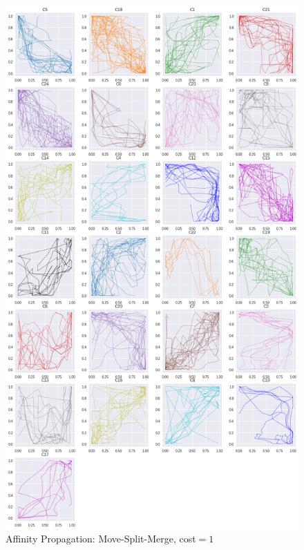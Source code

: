 \begin{figure}[h]
  \centering
  \includegraphics[width=\linewidth,height=\textheight,keepaspectratio]{figs/clusters/CLU_AP_ALL[MSM;c=1].png}
  \caption{Affinity Propagation: Move-Split-Merge, cost$=1$}
\end{figure}

